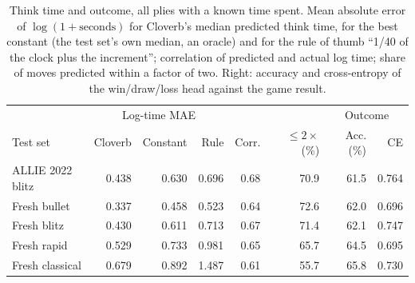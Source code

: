 \begin{table}[t]\centering\small
\caption{Think time and outcome, all plies with a known time spent. Mean absolute error of $\log(1+\text{seconds})$ for Cloverb's median predicted think time, for the best constant (the test set's own median, an oracle) and for the rule of thumb ``1/40 of the clock plus the increment''; correlation of predicted and actual log time; share of moves predicted within a factor of two. Right: accuracy and cross-entropy of the win/draw/loss head against the game result.}\label{tab:timing}
\begin{tabular}{lrrrrrrr}\toprule
 & \multicolumn{3}{c}{Log-time MAE} & & & \multicolumn{2}{c}{Outcome}\\
Test set & Cloverb & Constant & Rule & Corr. & $\le2\times$ (\%) & Acc. (\%) & CE\\\midrule
ALLIE 2022 blitz & 0.438 & 0.630 & 0.696 & 0.68 & 70.9 & 61.5 & 0.764 \\
Fresh bullet & 0.337 & 0.458 & 0.523 & 0.64 & 72.6 & 62.0 & 0.696 \\
Fresh blitz & 0.430 & 0.611 & 0.713 & 0.67 & 71.4 & 62.1 & 0.747 \\
Fresh rapid & 0.529 & 0.733 & 0.981 & 0.65 & 65.7 & 64.5 & 0.695 \\
Fresh classical & 0.679 & 0.892 & 1.487 & 0.61 & 55.7 & 65.8 & 0.730 \\
\bottomrule\end{tabular}\end{table}
